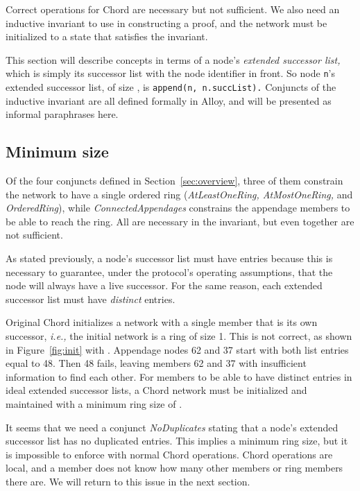 \documentclass[conference]{IEEEtran}
\begin{document}
Correct operations for Chord are necessary but not sufficient.
We also need an inductive invariant to use in
constructing a proof, and the network must be initialized to a state
that satisfies the invariant.

This section will describe concepts in terms of a node's
{\it extended successor list,}
which is simply its successor list with the node identifier in 
front.
So node
\small
{\tt n}'s
\normalsize
extended successor list, of size , is
\small
{\tt append(n, n.succList).}
\normalsize
Conjuncts of the inductive invariant
are all defined formally in Alloy, and will be
presented as informal paraphrases here.

\subsection{Minimum size}

Of the four conjuncts defined in Section~\ref{sec:overview},
three of them constrain the network to have a single ordered ring
({\it AtLeastOneRing, AtMostOneRing,} and {\it OrderedRing}), while
{\it ConnectedAppendages} constrains the appendage members to be able to
reach the ring.
All are necessary in the invariant,
but even together are not sufficient.

As stated previously, a node's 
successor list must have  entries because this is necessary
to guarantee, under the protocol's operating assumptions, that the node
will always have a live successor.
For the same reason, each extended successor list must have 
 {\it distinct} entries.

Original Chord initializes a network with a single member that is its
own successor, {\it i.e.,} the initial network is a ring of size 1.
This is not correct, as shown in
Figure~\ref{fig:init} with .
Appendage nodes 62 and 37 start with both list entries equal to 48.
Then 48 fails, leaving members 62 and 37
with insufficient information to find each other.
For members to be able to
have  distinct entries in ideal extended successor lists,
a Chord network must be initialized and maintained with a
minimum ring size of .

It seems that we need a conjunct {\it NoDuplicates} stating that a
node's extended successor list has no duplicated entries.
This implies a minimum ring size, but it is impossible to enforce
with normal Chord operations.
Chord operations are local, and a member does not know how many other
members or ring members there are.
We will return to this issue in the next section.
\end{document}
